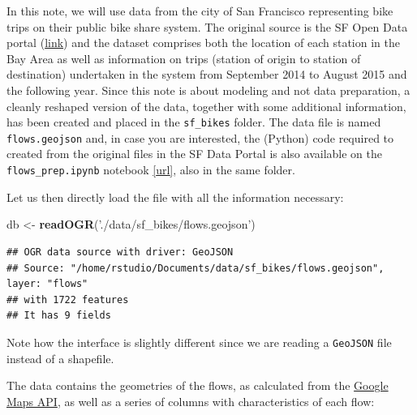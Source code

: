 \documentclass[
]{book}
\newenvironment{Shaded}{\begin{snugshade}}{\end{snugshade}}
\newcommand{\KeywordTok}[1]{\textcolor[rgb]{0.13,0.29,0.53}{\textbf{#1}}}
\newcommand{\NormalTok}[1]{#1}
\newcommand{\OperatorTok}[1]{\textcolor[rgb]{0.81,0.36,0.00}{\textbf{#1}}}
\newcommand{\OtherTok}[1]{\textcolor[rgb]{0.56,0.35,0.01}{#1}}
\newcommand{\StringTok}[1]{\textcolor[rgb]{0.31,0.60,0.02}{#1}}
\begin{document}
In this note, we will use data from the city of San Francisco representing bike trips on their public bike share system. The original source is the SF Open Data portal (\href{http://www.bayareabikeshare.com/open-data}{link}) and the dataset comprises both the location of each station in the Bay Area as well as information on trips (station of origin to station of destination) undertaken in the system from September 2014 to August 2015 and the following year. Since this note is about modeling and not data preparation, a cleanly reshaped version of the data, together with some additional information, has been created and placed in the \texttt{sf\_bikes} folder. The data file is named \texttt{flows.geojson} and, in case you are interested, the (Python) code required to created from the original files in the SF Data Portal is also available on the \texttt{flows\_prep.ipynb} notebook \href{https://github.com/darribas/spa_notes/blob/master/sf_bikes/flows_prep.ipynb}{{[}url{]}}, also in the same folder.

Let us then directly load the file with all the information necessary:

\begin{Shaded}
\begin{Highlighting}[]
\NormalTok{db <-}\StringTok{ }\KeywordTok{readOGR}\NormalTok{(}\StringTok{'./data/sf_bikes/flows.geojson'}\NormalTok{)}
\end{Highlighting}
\end{Shaded}

\begin{verbatim}
## OGR data source with driver: GeoJSON 
## Source: "/home/rstudio/Documents/data/sf_bikes/flows.geojson", layer: "flows"
## with 1722 features
## It has 9 fields
\end{verbatim}

\begin{Shaded}
\end{Shaded}

Note how the interface is slightly different since we are reading a \texttt{GeoJSON} file instead of a shapefile.

The data contains the geometries of the flows, as calculated from the \href{https://developers.google.com/maps/}{Google Maps API}, as well as a series of columns with characteristics of each flow:
\end{document}
